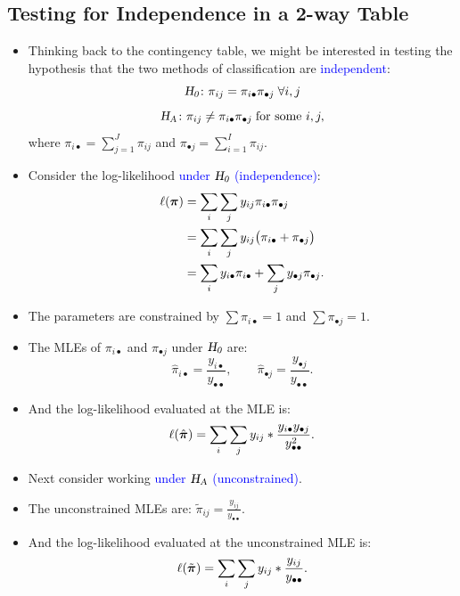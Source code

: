 \documentclass{article}\usepackage[]{graphicx}\usepackage[svgnames]{xcolor}
\let\log\relax%
\newcommand{\HN}{\textsl{H}_{\textsl{0}}}%
\newcommand{\HA}{\textsl{H}_{\textsl{A}}}%
\providecommand{\Vector}[1]{\bm{#1}}%
\begin{document}
\subsection*{Testing for Independence in a 2-way Table}
\begin{itemize}
      \item Thinking back to the contingency table, we might be interested in testing the
            hypothesis that the two methods of classification are \textcolor{Blue}{independent}:
            \[ \HN\colon \pi_{ij}=\pi_{i\bullet}\pi_{\bullet j}\;\forall i,j \]
            \[ \HA\colon \pi_{ij}\ne \pi_{i\bullet}\pi_{\bullet j}\;\text{for some } i,j, \]
            where $ \pi_{i\bullet}=\sum_{j=1}^{J}\pi_{ij} $ and $ \pi_{\bullet j}=\sum_{i=1}^{I}\pi_{ij} $.
      \item Consider the log-likelihood \textcolor{Blue}{under $ \HN $ (independence)}:
            \begin{align*}
                  \ell(\Vector{\pi})
                   & =\sum_{i} \sum_{j} y_{i j} \log{\pi_{i\bullet} \pi_{\bullet j}}                             \\
                   & =\sum_{i} \sum_{j} y_{i j}\bigl(\log{\pi_{i\bullet}} +\log{\pi_{\bullet j}} \bigr)          \\
                   & =\sum_{i} y_{i \bullet} \log{\pi_{i \bullet}}+\sum_{j} y_{\bullet j} \log{\pi_{\bullet j}}.
            \end{align*}
      \item The parameters are constrained by $ \sum \pi_{i\bullet}=1 $ and $ \sum \pi_{\bullet j}=1 $.
      \item The MLEs of $ \pi_{i\bullet} $ and $ \pi_{\bullet j}  $ under $ \HN $ are:
            \[ \hat{\pi}_{i\bullet}=\frac{y_{i\bullet}}{y_{\bullet\bullet}},\qquad \hat{\pi}_{\bullet j}=\frac{y_{\bullet j}}{y_{\bullet\bullet}}. \]
      \item And the log-likelihood evaluated at the MLE is:
            \[ \ell(\hat{\Vector{\pi}})=\sum_{i} \sum_{j} y_{i j} \log*{\frac{y_{i \bullet} y_{\bullet j}}{y_{\bullet\bullet}^{2}}}. \]
      \item Next consider working \textcolor{Blue}{under $ \HA $ (unconstrained)}.
      \item The unconstrained MLEs are: $ \tilde{\pi}_{ij}=\frac{y_{ij}}{y_{\bullet\bullet}} $.
      \item And the log-likelihood evaluated at the unconstrained MLE is:
            \[ \ell(\tilde{\Vector{\pi}})=\sum_{i} \sum_{j} y_{i j} \log*{\frac{y_{ij}}{y_{\bullet\bullet}}}. \]

\end{itemize}
\end{document}
